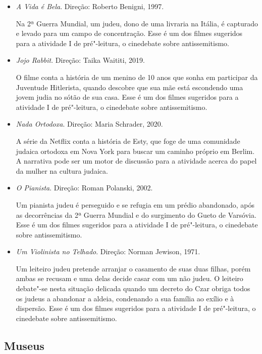 \documentclass[12pt]{extarticle}
\begin{document}
\begin{itemize}

\item\textit{A Vida é Bela}. Direção: Roberto Benigni, 1997.

Na 2ª Guerra Mundial, um judeu, dono de uma livraria na Itália,
é capturado e levado para um campo de concentração. Esse é um dos 
filmes sugeridos para a atividade I de pré"-leitura, 
o cinedebate sobre antissemitismo.

\item\textit{Jojo Rabbit}. Direção: Taika Waititi, 2019.

O filme conta a história de um menino de 10 anos que sonha
em participar da Juventude Hitlerista, quando descobre que sua
mãe está escondendo uma jovem judia no sótão de sua casa.
Esse é um dos 
filmes sugeridos para a atividade I de pré"-leitura, 
o cinedebate sobre antissemitismo.

\item\textit{Nada Ortodoxa}. Direção: Maria Schrader, 2020.

A série da Netflix conta a história de Esty, que foge de uma comunidade 
judaica ortodoxa em Nova York para buscar um caminho próprio em Berlim.
A narrativa pode ser um motor de discussão para a atividade
acerca do papel da mulher na cultura judaica.

\item\textit{O Pianista}. Direção: Roman Polanski, 2002.

Um pianista judeu é perseguido e se refugia em um prédio abandonado,
após as decorrências da 2ª Guerra Mundial e do surgimento do Gueto de Varsóvia.
Esse é um dos 
filmes sugeridos para a atividade I de pré"-leitura,
o cinedebate sobre antissemitismo.

\item\textit{Um Violinista no Telhado}. Direção: Norman Jewison, 1971.

Um leiteiro judeu pretende arranjar o casamento de suas duas filhas,
porém ambas se recusam e uma delas decide casar com um não judeu. O
leiteiro debate"-se nesta situação delicada quando um decreto do Czar
obriga todos os judeus a abandonar a aldeia, condenando a sua família ao
exílio e à dispersão. Esse é um dos 
filmes sugeridos para a atividade I de pré"-leitura, 
o cinedebate sobre antissemitismo.

\end{itemize}

\subsection{Museus}
\end{document}
